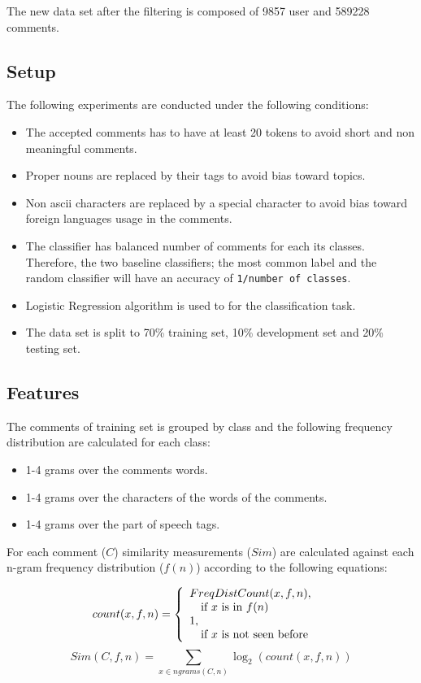 \documentclass[11pt]{article}
\begin{document}
The new data set after the filtering is composed of 9857 user and 589228 comments.

\subsection{Setup}
The following experiments are conducted under the following conditions:
\begin{itemize}
\item The accepted comments has to have at least 20 tokens to avoid short and non meaningful comments.
\item Proper nouns are replaced by their tags to avoid bias toward topics.
\item Non ascii characters are replaced by a special character to avoid bias toward foreign languages usage in the comments.
\item The classifier has balanced number of comments for each its classes. Therefore, the two baseline classifiers; the most common label and the random classifier will have an accuracy of \verb+1/number of classes+.
\item Logistic Regression algorithm is used to for the classification task.
\item The data set is split to 70\% training set, 10\% development set and 20\% testing set.
\end{itemize}

\subsection{Features}
The comments of training set is grouped by class and the following frequency distribution are calculated for each class:
\begin{itemize}
\item 1-4 grams over the comments words.
\item 1-4 grams over the characters of the words of the comments.
\item 1-4 grams over the part of speech tags.
\end{itemize}

For each comment ($C$) similarity measurements ($Sim$) are calculated against each n-gram frequency distribution ($f(n)$) according to the following equations:

\[
  count(x, f, n) = \left\{ 
  \begin{array}{l l}
    FreqDistCount(x, f, n), & \\\quad \text{if $x$ is in $f(n)$}\\
    1,&\\\quad \text{if $x$ is not seen before}\\
  \end{array} \right.
\]
\[
  Sim(C,f,n) = \sum_{x \in ngrams(C,n)} \log_2 (count(x,f,n))
\]
\end{document}
